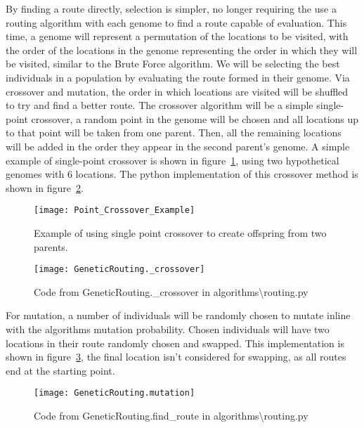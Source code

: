 \noindent
By finding a route directly, selection is simpler, no longer requiring the use a routing algorithm with each genome
to find a route capable of evaluation.
This time, a genome will represent a permutation of the locations to be visited, with the order of the locations in the
genome representing the order in which they will be visited, similar to the Brute Force algorithm.
We will be selecting the best individuals in a population by evaluating the route formed in their genome.
Via crossover and mutation, the order in which locations are visited will be shuffled to try and find a better
route.
The crossover algorithm will be a simple single-point crossover, a random point in the genome will be chosen and all
locations up to that point will be taken from one parent.
Then, all the remaining locations will be added in the order they appear in the second parent's genome.
A simple example of single-point crossover is shown in figure~\ref{fig:Point_Crossover_Example}, using two
hypothetical genomes with 6 locations.
The python implementation of this crossover method is shown in figure~\ref{fig:GeneticRouting._crossover}.
\begin{figure}[H]
    \centering
    \texttt{[image: Point\_Crossover\_Example]}
    \caption{Example of using single point crossover to create offspring from two parents.}
    \label{fig:Point_Crossover_Example}
\end{figure}
\begin{figure}[H]
    \centering
    \texttt{[image: GeneticRouting.\_crossover]}
    \caption{Code from GeneticRouting.\_crossover in algorithms\textbackslash routing.py}
    \label{fig:GeneticRouting._crossover}
\end{figure}

\noindent
For mutation, a number of individuals will be randomly chosen to mutate inline with the algorithms mutation
probability.
Chosen individuals will have two locations in their route randomly chosen and swapped.
This implementation is shown in figure~\ref{fig:GeneticRouting.mutation}, the final location isn't considered for
swapping, as all routes end at the starting point.
\begin{figure}[H]
    \centering
    \texttt{[image: GeneticRouting.mutation]}
    \caption{Code from GeneticRouting.find\_route in algorithms\textbackslash routing.py}
    \label{fig:GeneticRouting.mutation}
\end{figure}

